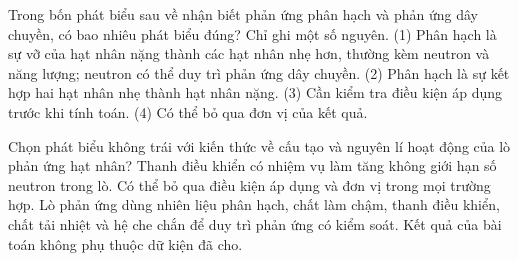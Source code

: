 \begin{ex}
Trong bốn phát biểu sau về nhận biết phản ứng phân hạch và phản ứng dây chuyền, có bao nhiêu phát biểu đúng? Chỉ ghi một số nguyên. (1) Phân hạch là sự vỡ của hạt nhân nặng thành các hạt nhân nhẹ hơn, thường kèm neutron và năng lượng; neutron có thể duy trì phản ứng dây chuyền. (2) Phân hạch là sự kết hợp hai hạt nhân nhẹ thành hạt nhân nặng. (3) Cần kiểm tra điều kiện áp dụng trước khi tính toán. (4) Có thể bỏ qua đơn vị của kết quả.
\end{ex}

\begin{ex}
Chọn phát biểu không trái với kiến thức về cấu tạo và nguyên lí hoạt động của lò phản ứng hạt nhân?
\choice
{Thanh điều khiển có nhiệm vụ làm tăng không giới hạn số neutron trong lò.}
{Có thể bỏ qua điều kiện áp dụng và đơn vị trong mọi trường hợp.}
{\True Lò phản ứng dùng nhiên liệu phân hạch, chất làm chậm, thanh điều khiển, chất tải nhiệt và hệ che chắn để duy trì phản ứng có kiểm soát.}
{Kết quả của bài toán không phụ thuộc dữ kiện đã cho.}
\end{ex}


